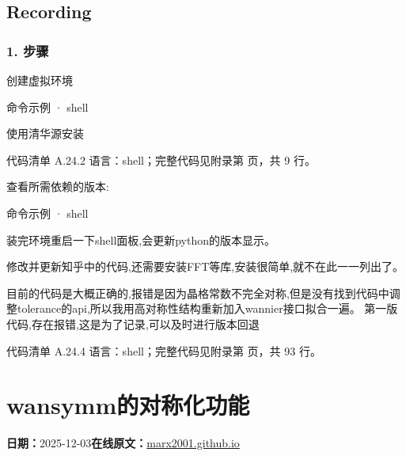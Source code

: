 \documentclass[lang=cn,scheme=chinese,color=blue,device=normal,toc=onecol,math=cm]{elegantbook}
\begin{document}
\subsection{Recording}


\subsubsection{1. 步骤}


创建虚拟环境\par


\begin{inlinecodebox}{命令示例 · shell}
\end{inlinecodebox}


使用清华源安装\par


\begin{codeindexbox}{代码清单 A.24.2}
语言：shell；完整代码见附录第 \pageref{code:24:2} 页，共 9 行。
\end{codeindexbox}


查看所需依赖的版本:\par


\begin{inlinecodebox}{命令示例 · shell}
\end{inlinecodebox}


装完环境重启一下shell面板,会更新python的版本显示。\par


修改并更新知乎中的代码,还需要安装FFT等库,安装很简单,就不在此一一列出了。\par


目前的代码是大概正确的,报错是因为晶格常数不完全对称,但是没有找到代码中调整tolerance的api,所以我用高对称性结构重新加入wannier接口拟合一遍。 第一版代码,存在报错,这是为了记录,可以及时进行版本回退\par


\begin{codeindexbox}{代码清单 A.24.4}
语言：shell；完整代码见附录第 \pageref{code:24:4} 页，共 93 行。
\end{codeindexbox}



\section{wansymm的对称化功能}
\begin{articlemeta}
\textbf{日期：}2025-12-03\hfill\textbf{在线原文：}\href{https://marx2001.github.io/sci-note\_posts/20251203-wannberrier}{marx2001.github.io}
\end{articlemeta}
\end{document}
